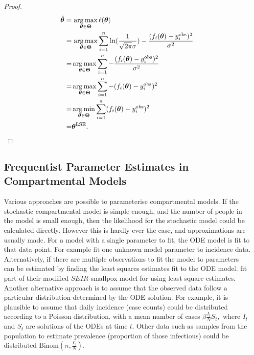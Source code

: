 \begin{proof}
    \begin{align*}
        \hat{\bm{\theta}}
        = & \, \operatorname*{arg\,max}_{\bm{\theta}\in\mathbf{\Theta}}\ell(\bm{\theta}) \\
        = & \, \operatorname*{arg\,max}_{\bm{\theta}\in\mathbf{\Theta}}
        \sum_{i = 1}^n
        \ln(\frac{1}{\sqrt{2\pi}\sigma})
        -\frac{(f_i(\bm{\theta})- y_i^{\mathrm{obs}})^2}{\sigma^2}            \\
        = & \operatorname*{arg\,max}_{\bm{\theta}\in\mathbf{\Theta}} \sum_{i = 1}^n
        - \frac{(f_i(\bm{\theta})- y_i^{\mathrm{obs}})^2 }{\sigma^2}          \\
        = & \operatorname*{arg\,max}_{\bm{\theta}\in\mathbf{\Theta}} \sum_{i = 1}^n
        - (f_i(\bm{\theta})- y_i^{\mathrm{obs}})^2                            \\
        = & \operatorname*{arg\,min}_{\bm{\theta}\in\mathbf{\Theta}} \sum_{i = 1}^n
        (f_i(\bm{\theta})- y_i^{\mathrm{obs}})^2                              \\
        = & \bm{\theta}^{\mathrm{LSE}}.
    \end{align*}
\end{proof}

\subsection*{Frequentist Parameter Estimates in Compartmental Models}

Various approaches are possible to parameterise compartmental models.
If the stochastic compartmental model is simple enough, and the number of
people in the model is small enough, then the likelihood
for the stochastic model could be calculated directly. However this is hardly
ever the case, and approximations are usually made.
For a model with a single parameter to fit, the ODE model is
fit to that data point. For example \cite{champagne_using_2022} fit one
unknown model parameter to incidence data.
Alternatively, if there are multiple observations to fit the model to
parameters can be estimated by finding the least squares estimates fit to
the ODE model.
\cite{gani_transmission_2001} fit part of their modified $SEIR$ smallpox model
for using least square estimates.
Another alternative approach
is to assume that the observed data follow a particular distribution
determined by the ODE solution. For example, it is plausible to assume that
daily incidence (case counts) could be distributed according to a Poisson
distribution, with a mean number of cases $\beta \frac{I_t}{N}S_t,$ where $I_t$
and $S_t$ are solutions of the ODEs at time $t$.
Other data such as samples from the population to estimate
prevalence (proportion of those infectious) could be
distributed $\mathrm{Binom}(n, \frac{I_t}{N}).$


